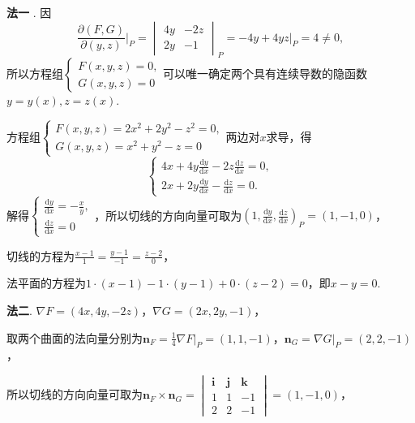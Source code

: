 \documentclass[../main.tex]{subfiles}
\begin{document}
\begin{enumerate}
          \textbf{法一} . 因
          \[
              \frac{\partial (F,G)}{\partial (y,z)}\bigg|_{P}=
              \begin{vmatrix}
                  4y & -2z \\
                  2y & -1
              \end{vmatrix}_{P}=\left.-4y+4yz\right|_{P}=4\neq 0,
          \]
          所以方程组$\begin{cases}
                  F(x,y,z)=0, \\
                  G(x,y,z)=0
              \end{cases}$可以唯一确定两个具有连续导数的隐函数$y=y(x),z=z(x)$.

          方程组$\begin{cases}
                  F(x,y,z) = 2x^{2}+2y^{2}-z^{2}=0, \\
                  G(x,y,z)=x^{2}+y^{2}-z=0
              \end{cases}$两边对$x$求导，得
          \[
              \begin{cases}
                  4x+4y\frac{\mathrm{d}y}{\mathrm{d}x}-2z\frac{\mathrm{d}z}{\mathrm{d}x}= 0, \\[6pt]
                  2x+2y\frac{\mathrm{d}y}{\mathrm{d}x}-\frac{\mathrm{d}z}{\mathrm{d}x}= 0.
              \end{cases}
          \]
          解得$\begin{cases}
                  \frac{\mathrm{d}y}{\mathrm{d}x} = -\frac{x}{y}, \\
                  \frac{\mathrm{d}z}{\mathrm{d}x} = 0
              \end{cases}$，所以切线的方向向量可取为$\left(1,\frac{\mathrm{d}y}{\mathrm{d}x}
              ,\frac{\mathrm{d}z}{\mathrm{d}x}\right)_{P}=(1,-1,0)$，

          切线的方程为$\frac{x-1}{1}=\frac{y-1}{-1}=\frac{z-2}{0}$，

          法平面的方程为$1\cdot(x-1)-1\cdot(y-1)+0\cdot(z-2)=0$，即$x-y=0$.

          \textbf{法二}. $\nabla F = (4x,4y,-2z)$，$\nabla G = (2x,2y,-1)$，

          取两个曲面的法向量分别为$\boldsymbol{n}_{F} = \frac{1}{4}\nabla F|_{P} = (1
              ,1,-1)$，$\boldsymbol{n}_{G} = \nabla G|_{P} = (2,2,-1)$，

          所以切线的方向向量可取为$\boldsymbol{n}_{F}\times \boldsymbol{n}_{G} =
              \begin{vmatrix}
                  \boldsymbol{i} & \boldsymbol{j} & \boldsymbol{k} \\
                  1              & 1              & -1             \\
                  2              & 2              & -1
              \end{vmatrix}
              = (1,-1,0)$，


\end{enumerate}
\end{document}
